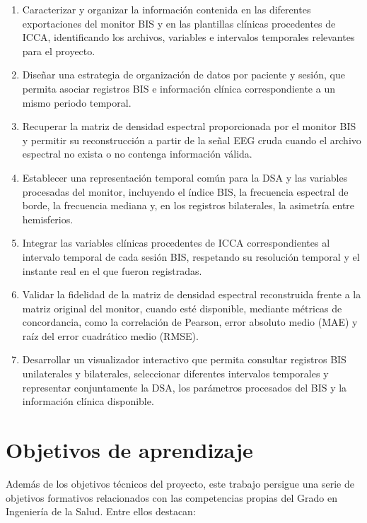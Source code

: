 \documentclass[
  spanish,
  a4paper,
  12pt,
  twoside]{memoir}
\providecommand{\tightlist}{%
  \setlength{\itemsep}{0pt}\setlength{\parskip}{0pt}}
\begin{document}
\begin{enumerate}
\def\labelenumi{\arabic{enumi}.}
\tightlist
\item
  Caracterizar y organizar la información contenida en las diferentes
  exportaciones del monitor BIS y en las plantillas clínicas procedentes
  de ICCA, identificando los archivos, variables e intervalos temporales
  relevantes para el proyecto.
\item
  Diseñar una estrategia de organización de datos por paciente y sesión,
  que permita asociar registros BIS e información clínica
  correspondiente a un mismo periodo temporal.
\item
  Recuperar la matriz de densidad espectral proporcionada por el monitor
  BIS y permitir su reconstrucción a partir de la señal EEG cruda cuando
  el archivo espectral no exista o no contenga información válida.
\item
  Establecer una representación temporal común para la DSA y las
  variables procesadas del monitor, incluyendo el índice BIS, la
  frecuencia espectral de borde, la frecuencia mediana y, en los
  registros bilaterales, la asimetría entre hemisferios.
\item
  Integrar las variables clínicas procedentes de ICCA correspondientes
  al intervalo temporal de cada sesión BIS, respetando su resolución
  temporal y el instante real en el que fueron registradas.
\item
  Validar la fidelidad de la matriz de densidad espectral reconstruida
  frente a la matriz original del monitor, cuando esté disponible,
  mediante métricas de concordancia, como la correlación de Pearson,
  error absoluto medio (MAE) y raíz del error cuadrático medio (RMSE).
\item
  Desarrollar un visualizador interactivo que permita consultar
  registros BIS unilaterales y bilaterales, seleccionar diferentes
  intervalos temporales y representar conjuntamente la DSA, los
  parámetros procesados del BIS y la información clínica disponible.
\end{enumerate}

\section{Objetivos de aprendizaje}\label{objetivos-de-aprendizaje}

Además de los objetivos técnicos del proyecto, este trabajo persigue una
serie de objetivos formativos relacionados con las competencias propias
del Grado en Ingeniería de la Salud. Entre ellos destacan:
\end{document}
